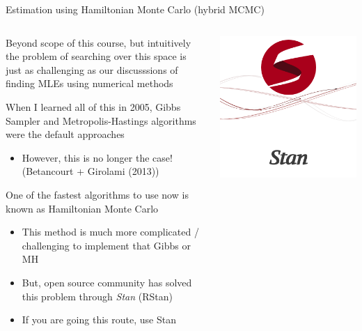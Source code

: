 \documentclass[notes,11pt, aspectratio=169]{beamer}
\newenvironment{wideitemize}{\itemize\addtolength{\itemsep}{10pt}}{\enditemize}
\begin{document}
\begin{frame}{Estimation using Hamiltonian Monte Carlo (hybrid MCMC)}
  \begin{columns}[T] %
    \begin{column}{.7\textwidth}
  \begin{wideitemize}
  \item Beyond scope of this course, but intuitively the problem of
    searching over this space is just as challenging as our
    discusssions of finding MLEs using numerical methods
  \item When I learned all of this in 2005, Gibbs Sampler and
    Metropolis-Hastings algorithms were the default approaches
    \begin{itemize}
    \item However, this is no longer the case! (Betancourt + Girolami
      (2013))
    \end{itemize}
  \item One of the fastest algorithms to use now is known as
    Hamiltonian Monte Carlo
    \begin{itemize}
    \item This method is much more complicated / challenging to implement that Gibbs or MH
    \item But, open source community has solved this problem through \textit{Stan} (RStan)
    \item If you are going this route, use Stan
    \end{itemize}
  \end{wideitemize}
\end{column}
\begin{column}{0.3\textwidth}
  \includegraphics[width=\linewidth]{images/stan.png}
\end{column}
\end{columns}
\end{frame}
\end{document}
